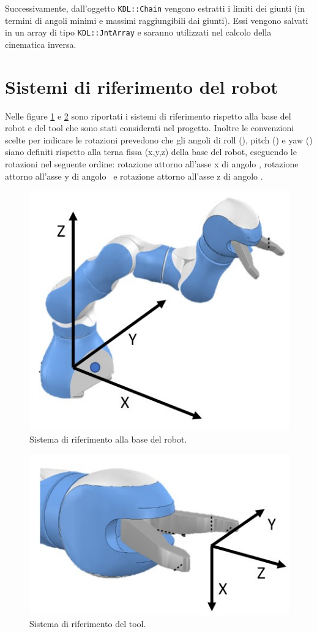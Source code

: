 Successivamente, dall'oggetto \texttt{KDL::Chain} vengono estratti i limiti dei giunti (in termini di angoli minimi e massimi raggiungibili dai giunti). Essi vengono salvati in un array di tipo \texttt{KDL::JntArray} e saranno utilizzati nel calcolo della cinematica inversa.

\section{Sistemi di riferimento del robot}
Nelle figure \ref{fig:base_frame} e \ref{fig:tool_frame} sono riportati i sistemi di riferimento rispetto alla base del robot e del tool che sono stati considerati nel progetto. Inoltre le convenzioni scelte per indicare le rotazioni prevedono che gli angoli di roll (\textalpha), pitch (\textbeta) e yaw (\textgamma) siano definiti rispetto alla terna fissa (x,y,z) della base del robot, eseguendo le rotazioni nel seguente ordine: rotazione attorno all'asse x di angolo \textalpha, rotazione attorno all'asse y di angolo \textbeta\ e rotazione attorno all'asse z di angolo \textgamma.

\begin{figure}[tbh]
	\centering
	\includegraphics[width=0.5\linewidth]{./ImageFiles/prob_frame_base}
	\caption{Sistema di riferimento alla base del robot.}
	\label{fig:base_frame}
\end{figure}

\begin{figure}[tbh]
	\centering
	\includegraphics[width=0.5\linewidth]{./ImageFiles/prob_frame_tool.jpg}
	\caption{Sistema di riferimento del tool.}
	\label{fig:tool_frame}
\end{figure}

